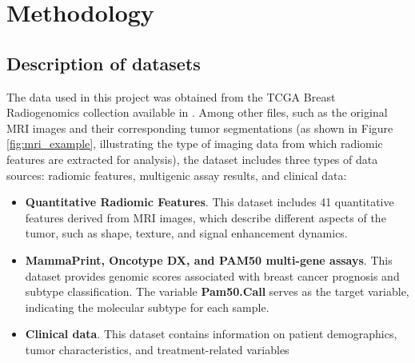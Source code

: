 \documentclass[conference]{IEEEtran}
\begin{document}

\section{Methodology}

\subsection{Description of datasets}


The data used in this project was obtained from the TCGA Breast Radiogenomics collection available in \cite{b3}. Among other files, such as the original MRI images and their corresponding tumor segmentations (as shown in Figure \ref{fig:mri_example}, illustrating the type of imaging data from which radiomic features are extracted for analysis), the dataset includes three types of data sources: radiomic features, multigenic assay results, and clinical data:

\begin{itemize}
	\item \textbf{Quantitative Radiomic Features}.  This dataset includes 41 quantitative features derived from MRI images, which describe different aspects of the tumor, such 		as shape, texture, and signal enhancement dynamics.

	\item \textbf{MammaPrint, Oncotype DX, and PAM50 multi-gene assays}. This dataset provides genomic scores associated with breast cancer prognosis and subtype 			classification. The variable \textbf{Pam50.Call} serves as the target variable, indicating the molecular subtype for each sample.

	\item \textbf{Clinical data}. This dataset contains information on patient demographics, tumor characteristics, and treatment-related variables

\end{itemize}
\end{document}
